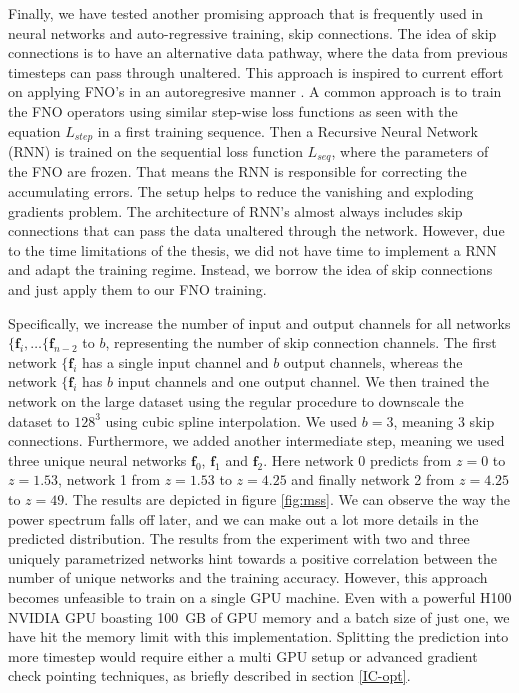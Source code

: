 \documentclass{article}
\begin{document}
Finally, we have tested another promising approach that is frequently used in neural networks and auto-regressive training, skip connections. The idea of skip connections is to have an alternative data pathway, where the data from previous timesteps can pass through unaltered.  This approach is inspired to current effort on applying FNO's in an autoregresive manner \citep{li2020fourier, gopakumar2023fourier}. A common approach is to train the FNO operators using similar step-wise loss functions as seen with the equation $L_{step}$ in a first training sequence. Then a Recursive Neural Network (RNN) is trained on the sequential loss function $L_{seq}$, where the parameters of the FNO are frozen. That means the RNN is responsible for correcting the accumulating errors. The setup helps to reduce the vanishing and exploding gradients problem. The architecture of RNN's almost always includes skip connections that can pass the data unaltered through the network. However, due to the time limitations of the thesis, we did not have time to implement a RNN and adapt the training regime. Instead, we borrow the idea of skip connections and just apply them to our FNO training.

Specifically, we increase the number of input and output channels for all networks $\{\mathbf{f}_i, \dots \{\mathbf{f}_{n-2}$ to $b$, representing the number of skip connection channels. The first network $\{\mathbf{f}_i$ has a single input channel and $b$ output channels, whereas the network $\{\mathbf{f}_i$ has $b$ input channels and one output channel. We then trained the network on the large dataset using the regular procedure to downscale the dataset to $128^3$ using cubic spline interpolation. We used $b=3$, meaning 3 skip connections. Furthermore, we added another intermediate step, meaning we used three unique neural networks $\mathbf{f}_0$, $\mathbf{f}_1$ and $\mathbf{f}_2$. Here network 0 predicts from $z=0$ to $z=1.53$, network 1 from $z=1.53$ to $z=4.25$ and finally network 2 from $z=4.25$ to $z=49$. The results are depicted in figure \ref{fig:mss}. We can observe the way the power spectrum falls off later, and we can make out a lot more details in the predicted distribution. The results from the experiment with two and three uniquely parametrized networks hint towards a positive correlation between the number of unique networks and the training accuracy. However, this approach becomes unfeasible to train on a single GPU machine. Even with a powerful H100 NVIDIA GPU boasting 100 GB of GPU memory and a batch size of just one, we have hit the memory limit with this implementation. Splitting the prediction into more timestep would require either a multi GPU setup or advanced gradient check pointing techniques, as briefly described in section \ref{IC-opt}. 
\end{document}
